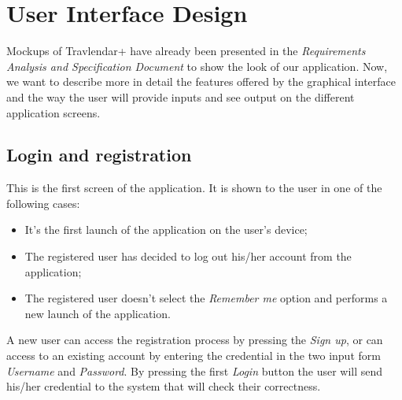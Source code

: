 \documentclass[12pt,titlepage]{article}
\begin{document}
\section{User Interface Design}
Mockups of Travlendar+ have already been presented in the \textit{Requirements Analysis and Specification Document} to show the look of our application. Now, we want to describe more in detail the features offered by the graphical interface and the way the user will provide inputs and see output on the different application screens.
\clearpage
\newpage

\subsection{Login and registration}\label{sec:Login}
This is the first screen of the application. It is shown to the user in one of the following cases:
\begin{itemize}
\item It's the first launch of the application on the user's device;
\item The registered user has decided to log out his/her account from the application;
\item The registered user doesn't select the \textit{Remember me} option and performs a new launch of the application.
\end{itemize}
A new user can access the registration process by pressing the \textit{Sign up}, or can access to an existing account by entering the credential in the two input form \textit{Username} and \textit{Password}. By pressing the first \textit{Login} button the user will send his/her credential to the system that will check their correctness.
\end{document}
